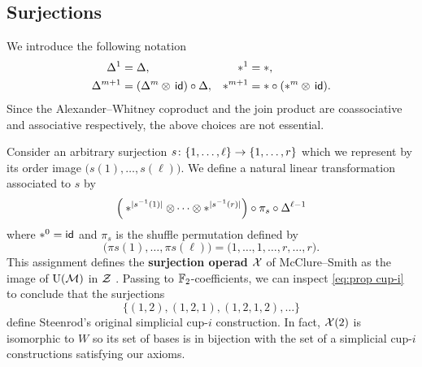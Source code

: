 
\subsection{Surjections}

We introduce the following notation
\begin{align*}
	\Delta^1 &= \Delta, &
	\ast^1 &= \ast, \\
	\Delta^{m+1} &= (\Delta^m \otimes \, \mathsf{id}) \circ \Delta, &
	\ast^{m+1} &= \ast \circ (\ast^m \otimes \, \mathsf{id}).
\end{align*}
Since the Alexander--Whitney coproduct and the join product are coassociative and associative respectively, the above choices are not essential.

Consider an arbitrary surjection $s \colon \{1,\dots,\ell\} \to \{1,\dots,r\}$ which we represent by its order image $\big(s(1),\dots,s(\ell)\big)$.
We define a natural linear transformation associated to $s$ by
\begin{equation}\label{e:surjection action}
	\Big( \ast^{\lvert s^{-1}(1)\rvert} \otimes \dotsb \otimes \ast^{\lvert s^{-1}(r)\rvert} \Big) \circ \pi_s \circ \Delta^{\ell-1}
\end{equation}
where $\ast^0 = \mathsf{id}$ and $\pi_s$ is the shuffle permutation defined by
\[
\big( \pi s(1), \dots, \pi s(\ell) \big) =
\big( 1, \dots, 1, \dots, r, \dots, r \big).
\]
This assignment defines the \textbf{surjection operad} $\mathcal{X}$ of McClure--Smith \cite{mcclure2003multivariable} as the image of $\operatorname{U}(\mathcal{M})$ in $\mathcal{Z}$ \cite[Appendix 1]{medina2020prop1}.
Passing to ${\mathbb{F}_2}$-coefficients, we can inspect \cref{eq:prop cup-i} to conclude that the surjections
\[
\big\{ (1,2), (1,2,1), (1,2,1,2), \dots \big\}
\]
define Steenrod's original simplicial \mbox{cup-$i$} construction.
In fact, $\mathcal{X}(2)$ is isomorphic to $W$ so its set of bases is in bijection with the set of a simplicial \mbox{cup-$i$} constructions satisfying our axioms.

